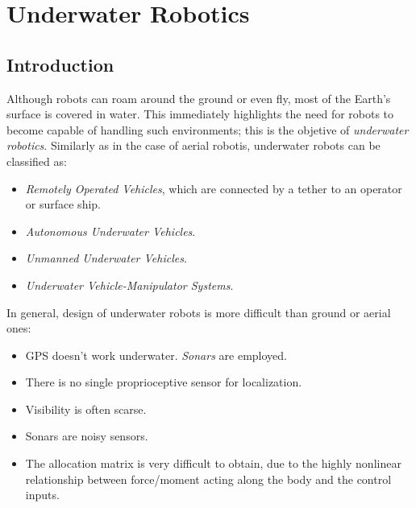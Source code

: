 \chapter{Underwater Robotics}
\section{Introduction}
Although robots can roam around the ground or even fly, most of the Earth's surface is covered in water. This immediately highlights the need for robots to become capable of handling such environments; this is the objetive of \textit{underwater robotics}. Similarly as in the case of aerial robotis, underwater robots can be classified as:
\begin{itemize}
    \item \textit{Remotely Operated Vehicles}, which are connected by a tether to an operator or surface ship.
    \item \textit{Autonomous Underwater Vehicles}.
    \item \textit{Unmanned Underwater Vehicles}.
    \item \textit{Underwater Vehicle-Manipulator Systems}.
\end{itemize}
In general, design of underwater robots is more difficult than ground or aerial ones:
\begin{itemize}
    \item GPS doesn't work underwater. \textit{Sonars} are employed.
    \item There is no single proprioceptive sensor for localization.
    \item Visibility is often scarse.
    \item Sonars are noisy sensors.
    \item The allocation matrix is very difficult to obtain, due to the highly nonlinear relationship between force/moment acting along the body and the control inputs.
\end{itemize}
